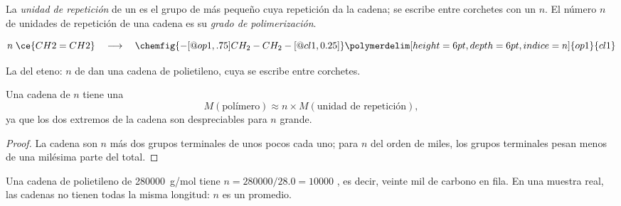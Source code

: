\begin{definition}\label{def:g12:polymers:repeat-unit}
La \emph{unidad de repetición} de un 
es el grupo de  más pequeño cuya repetición da la cadena; se
escribe entre corchetes con un  $n$. El número $n$ de unidades
de repetición de una cadena es su \emph{grado de
polimerización}.
\end{definition}

\begin{omfigure}
\[
  n\;\ce{CH2=CH2}
  \quad\longrightarrow\quad
  \chemfig{-[@{op1,.75}]CH_2-CH_2-[@{cl1,0.25}]}
  \polymerdelim[height=6pt, depth=6pt, indice=n]{op1}{cl1}
\]

{\small La  del eteno: $n$  de  dan una
cadena de polietileno, cuya   se
escribe entre corchetes.}
\end{omfigure}

\begin{proposition}\label{prop:g12:polymers:molar-mass}
Una cadena de  $n$ tiene una 
\[
  M(\text{polímero}) \approx n \times M(\text{unidad de repetición}) ,
\]
ya que los dos extremos de la cadena son despreciables para $n$ grande.
\end{proposition}

\begin{proof}
La cadena son $n$  más dos grupos terminales de
unos pocos  cada uno; para $n$ del orden de miles, los grupos
terminales pesan menos de una milésima parte del total.
\end{proof}

\begin{example}\label{ex:g12:polymers:pe}
Una cadena de polietileno de  \qty{280000}{g/mol} tiene
$n = 280000/28.0 = 10000$ , es decir, veinte mil
 de carbono en fila. En una muestra real, las cadenas no tienen
todas la misma longitud: $n$ es un promedio.
\end{example}

